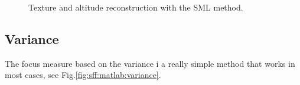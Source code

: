 \begin{figure}[htbp]
 \centering
 \hfill

 \hfill
 
 \caption{Texture and altitude reconstruction with the SML method.}
 \label{fig:sff:matlab:sml}
 
\end{figure}


\subsection{Variance}
The focus measure based on the variance i a really simple method that works in most cases, see Fig.\ref{fig:sff:matlab:variance}.

